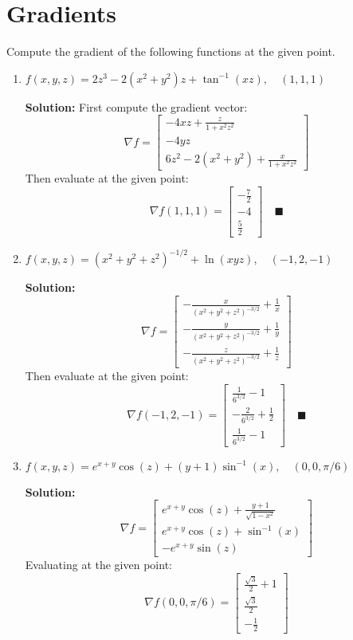 \documentclass[letterpaper, 11pt]{article}
\begin{document}
\section{Gradients}
Compute the gradient of the following functions at the given point. 
\begin{enumerate}
\item $f(x,y,z) = 2z^3 - 2(x^2 + y^2)z + \tan^{-1}(xz),\quad (1,1,1)$
\par \textbf{Solution:}
First compute the gradient vector:
\[ \nabla f = \left[ \begin{array}{c} -4xz + \frac{z}{1 + x^2 z^2} \\ -4yz \\ 6z^2 - 2(x^2 + y^2) + \frac{ x}{1 + x^2 z^2} \end{array} \right] \]
Then evaluate at the given point:
\[ \nabla f(1,1,1) = \left[ \begin{array}{c} -\frac{7}{2} \\ -4 \\ \frac{5}{2} \end{array} \right] \quad\blacksquare \]

\item $f(x,y,z) = (x^2 + y^2 + z^2)^{-1/2} + \ln(xyz),\quad (-1,2,-1)$
\par \textbf{Solution:}
\[ \nabla f = \left[ \begin{array}{c} -\frac{x}{(x^2 + y^2 + z^2)^{-3/2}} + \frac{1}{x} \\ -\frac{y}{(x^2 + y^2 + z^2)^{-3/2}} + \frac{1}{y} \\ -\frac{z}{(x^2 + y^2 + z^2)^{-3/2}} + \frac{1}{z} \end{array} \right] \]
Then evaluate at the given point:
\[ \nabla f(-1,2,-1) = \left[ \begin{array}{c} \frac{1}{6^{3/2}} - 1 \\ -\frac{2}{6^{3/2}} + \frac{1}{2} \\ \frac{1}{6^{3/2}} - 1 \end{array} \right] \quad\blacksquare \]

\item $f(x,y,z) = e^{x + y}\cos(z) + (y + 1)\sin^{-1}(x), \quad (0,0,\pi/6)$
\par \textbf{Solution:}
\[ \nabla f =  \left[ \begin{array}{c} e^{x+y}\cos(z) + \frac{y + 1}{\sqrt{1 - x^2}} \\ e^{x + y}\cos(z) + \sin^{-1}(x) \\ -e^{x + y}\sin(z)  \end{array} \right] \]
Evaluating at the given point:
\[ \nabla f(0,0,\pi/6) = 
\left[ \begin{array}{c} \frac{\sqrt{3}}{2} + 1  \\ \frac{\sqrt{3}}{2}  \\ -\frac{1}{2}  \end{array} \right] \]

\end{enumerate}
\end{document}
